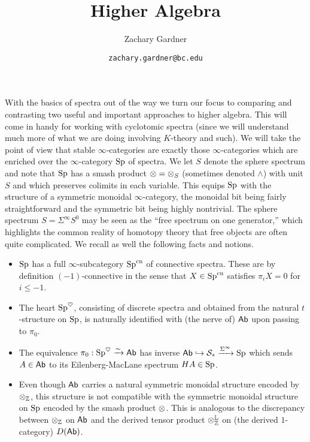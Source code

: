 \documentclass[11pt]{article}
\renewcommand{\L}{\mathbb{L}}
\renewcommand{\S}{\mathcal{S}}
\DeclareMathOperator{\cn}{cn} %
\begin{document}
\title{Higher Algebra}
\author{Zachary Gardner}
\date{\texttt{zachary.gardner@bc.edu}}
\maketitle

With the basics of spectra out of the way we turn our focus to comparing and contrasting two useful and important approaches to higher algebra. This will come in handy for working with cyclotomic spectra (since we will understand much more of what we are doing involving $K$-theory and such). We will take the point of view that stable $\infty$-categories are exactly those $\infty$-categories which are enriched over the $\infty$-category $\textup{Sp}$ of spectra. We let $S$ denote the sphere spectrum and note that $\textup{Sp}$ has a smash product $\otimes=\otimes_S$ (sometimes denoted $\wedge$) with unit $S$ and which preserves colimits in each variable. This equips $\textup{Sp}$ with the structure of a symmetric monoidal $\infty$-category, the monoidal bit being fairly straightforward and the symmetric bit being highly nontrivial. The sphere spectrum $S=\Sigma^{\infty}S^0$ may be seen as the ``free spectrum on one generator,'' which highlights the common reality of homotopy theory that free objects are often quite complicated. We recall as well the following facts and notions.
\begin{itemize}
\item $\textup{Sp}$ has a full $\infty$-subcategory $\Sp^{\cn}$ of connective spectra. These are by definition $(-1)$-connective in the sense that $X\in\Sp^{\cn}$ satisfies $\pi_iX=0$ for $i\leq-1$.

\item The heart $\textup{Sp}^{\heartsuit}$, consisting of discrete spectra and obtained from the natural $t$-structure on $\textup{Sp}$, is naturally identified with (the nerve of) $\operatorname{\mathsf{Ab}}$ upon passing to $\pi_0$.

\item The equivalence $\pi_0: \textup{Sp}^{\heartsuit}\xrightarrow{\sim}\operatorname{\mathsf{Ab}}$ has inverse $\Ab\inj\S_*\xto{\Sigma^{\infty}}\Sp$ which sends $A\in\operatorname{\mathsf{Ab}}$ to its Eilenberg-MacLane spectrum $HA\in\textup{Sp}$.

\item Even though $\operatorname{\mathsf{Ab}}$ carries a natural symmetric monoidal structure encoded by $\otimes_{\mathbb{Z}}$, this structure is not compatible with the symmetric monoidal structure on $\textup{Sp}$ encoded by the smash product $\otimes$. This is analogous to the discrepancy between $\otimes_{\mathbb{Z}}$ on $\operatorname{\mathsf{Ab}}$ and the derived tensor product $\tensor_{\Z}^{\L}$ on (the derived $1$-category) $D(\operatorname{\mathsf{Ab}})$.
\end{itemize}
\end{document}
